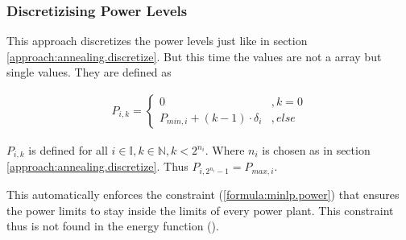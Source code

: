 \subsubsection{Discretizising Power Levels}

This approach discretizes the power levels just like in section \ref{approach:annealing.discretize}.
But this time the values are not a array but single values.
They are defined as

\begin{align}
  P_{i, k} = \begin{cases}
    0 & , k = 0 \\
    P_{min, i} + (k - 1) \cdot \delta_i & , else
  \end{cases}
\end{align}

$P_{i, k}$ is defined for all $i \in \mathbb{I}, k \in \mathbb{N}, k < 2^{n_i}$.
Where $n_i$ is chosen as in section \ref{approach:annealing.discretize}.
Thus $P_{i, 2^{n_i} - 1} = P_{max, i}$.

This automatically enforces the constraint (\ref{formula:minlp.power}) that ensures the power limits to stay inside the limits of every power plant.
This constraint thus is not found in the energy function ().
